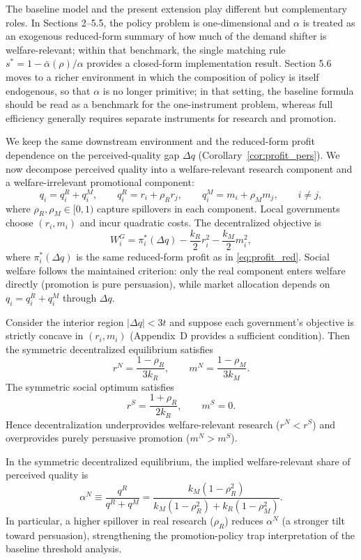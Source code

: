 The baseline model and the present extension play different but complementary roles.
In Sections 2--5.5, the policy problem is one-dimensional and $\alpha$ is treated as an exogenous reduced-form summary of how much of the demand shifter is welfare-relevant; within that benchmark, the single matching rule $s^*=1-\bar\alpha(\rho)/\alpha$ provides a closed-form implementation result.
Section 5.6 moves to a richer environment in which the composition of policy is itself endogenous, so that $\alpha$ is no longer primitive; in that setting, the baseline formula should be read as a benchmark for the one-instrument problem, whereas full efficiency generally requires separate instruments for research and promotion.

We keep the same downstream environment and the reduced-form profit dependence on the perceived-quality gap $\Delta q$ (Corollary~\ref{cor:profit_pers}). We now decompose perceived quality into a welfare-relevant research component and a welfare-irrelevant promotional component:
\[
q_i = q_i^R + q_i^M,\qquad
q_i^R = r_i + \rho_R r_j,\qquad
q_i^M = m_i + \rho_M m_j,\qquad i\neq j,
\]
where $\rho_R,\rho_M\in[0,1)$ capture spillovers in each component. Local governments choose $(r_i,m_i)$ and incur quadratic costs. The decentralized objective is
\[
W_i^G=\pi_i^*(\Delta q)-\frac{k_R}{2}r_i^2-\frac{k_M}{2}m_i^2,
\]
where $\pi_i^*(\Delta q)$ is the same reduced-form profit as in \eqref{eq:profit_red}. Social welfare follows the maintained criterion: only the real component enters welfare directly (promotion is pure persuasion), while market allocation depends on $q_i=q_i^R+q_i^M$ through $\Delta q$.

\begin{proposition}
\label{prop:two_input}
Consider the interior region $|\Delta q|<3t$ and suppose each government's objective is strictly concave in $(r_i,m_i)$ (Appendix~D provides a sufficient condition). Then the symmetric decentralized equilibrium satisfies
\[
r^N=\frac{1-\rho_R}{3k_R},\qquad
m^N=\frac{1-\rho_M}{3k_M}.
\]
The symmetric social optimum satisfies
\[
r^S=\frac{1+\rho_R}{2k_R},\qquad
m^S=0.
\]
Hence decentralization underprovides welfare-relevant research ($r^N<r^S$) and overprovides purely persuasive promotion ($m^N>m^S$).
\end{proposition}

\begin{corollary}
\label{cor:alpha_endog}
In the symmetric decentralized equilibrium, the implied welfare-relevant share of perceived quality is
\[
\alpha^N \equiv \frac{q^R}{q^R+q^M}
=
\frac{k_M(1-\rho_R^2)}{k_M(1-\rho_R^2)+k_R(1-\rho_M^2)}.
\]
In particular, a higher spillover in real research ($\rho_R$) reduces $\alpha^N$ (a stronger tilt toward persuasion), strengthening the promotion-policy trap interpretation of the baseline threshold analysis.
\end{corollary}

